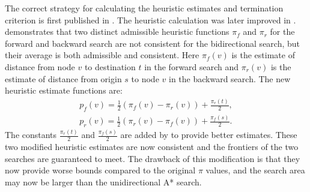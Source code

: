 \begin{comment}
\begin{figure}[H]
    \tikzstyle{main node} = [circle, draw, text centered, minimum height=2.5em]
    \tikzstyle{line} = [draw, -latex']
    \centering
    \begin{tikzpicture}[>=stealth', line width=1pt, auto, node distance=3cm]
        \node [main node] (s) at (0,0)  {s};
        \node [main node] (v) at (2,3)  {v};
        \node [main node] (w) at (7,4)  {w};
        \node [main node] (t) at (8,7)  {t};

        \path [line, dashed] (s) -- node [right] {$\pi_r(v)$} (v);
        \path [line, dashed] (s) -- node [right] {$\pi_r(w)$} (w);
        \path [line, dashed] (v) -- node {$\pi_f(v)$} (t);
        \path [line, dashed] (w) -- node [left] {$\pi_f(w)$} (t);

        \draw [line, out=300, in=200, bend left] (s.north) to node [left] {$c_{st}$} (v);
        \draw [line, out=70, in=45, bend right] (w.east) to node [right] {$c_{wt}$} (t.east);
        \draw [line] (v.east) to node [above] {$c_{vw}$} (w);
    \end{tikzpicture}
    \caption{Heuristic values for bidirectional A* search}
    \label{fig:bidirect_heuristic}
\end{figure}
\end{comment}

The correct strategy for calculating the heuristic estimates and termination criterion is first published in \citet{Pohl}.
The heuristic calculation was later improved in \citet{Ikeda}.
\citet{Ikeda} demonstrates that two distinct admissible heuristic functions $\pi_f$ and $\pi_r$ for the forward and backward search are not consistent for the bidirectional search, but their average is both admissible and consistent.
Here $\pi_f(v)$ is the estimate of distance from node $v$ to destination $t$ in the forward search and $\pi_r(v)$ is the estimate of distance from origin $s$ to node $v$ in the backward search. 
The new heuristic estimate functions are:
\begin{align}
    p_f(v) = \frac{1}{2}(\pi_f(v)-\pi_r(v)) + \frac{\pi_r(t)}{2}, \\
    p_r(v) = \frac{1}{2}(\pi_r(v)-\pi_f(v)) + \frac{\pi_f(s)}{2}.
\end{align}
The constants $\frac{\pi_r(t)}{2}$ and $\frac{\pi_f(s)}{2}$ are added by \citet{GoldbergEPP} to provide better estimates.
These two modified heuristic estimates are now consistent and the frontiers of the two searches are guaranteed to meet.
The drawback of this modification is that they now provide worse bounds compared to the original $\pi$ values,
and the search area may now be larger than the unidirectional A* search.

